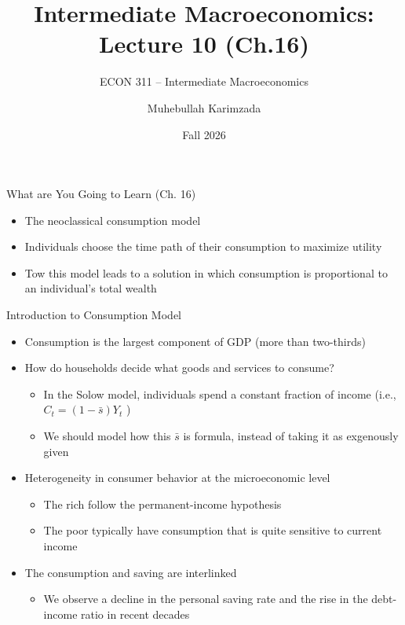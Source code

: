 \documentclass[aspectratio=1610]{beamer}
\title[Fall - Lecture 10] %
{Intermediate Macroeconomics: Lecture  10 (Ch.16)}
\subtitle{ECON 311 -- Intermediate Macroeconomics}
\author{Muhebullah Karimzada}
\institute{School of Economics \\\ University of Northern British Columbia}
\date{Fall 2026}
\begin{document}
\begin{frame}[plain]
  \titlepage
\end{frame}


\begin{frame}[wide]{What are You Going to Learn (Ch. 16)}
	\begin{itemize}
		\item The neoclassical consumption model
		\item Individuals choose the time path of their consumption to maximize utility
		
		\item Tow this model leads to a solution in which consumption is proportional to an individual’s total wealth
	\end{itemize}
\end{frame}

\begin{frame}[wide]{Introduction to Consumption Model}
	\begin{itemize}
		\item Consumption is the largest component of GDP (more than two-thirds)
		\item How do households decide what goods and services to consume?
		\vspace{1mm}
		\begin{itemize}
			\item In the Solow model, individuals spend a constant fraction of income  (i.e., $C_t = (1-\bar{s})Y_t$ )
			\item We should model how this $\bar{s}$ is formula, instead of taking it as exgenously given
		\end{itemize}
		\item Heterogeneity in consumer behavior at the microeconomic level
		\vspace{1mm}
		\begin{itemize}
			\item The rich follow the permanent-income hypothesis
			\item The poor typically have consumption that is quite sensitive to current income
		\end{itemize}
		\item The consumption and saving are interlinked
		\vspace{1mm}
		\begin{itemize}
			\item We observe a decline in the personal saving rate and the rise in the debt-income ratio in recent decades
		\end{itemize}
	\end{itemize}
\end{frame}
\end{document}
